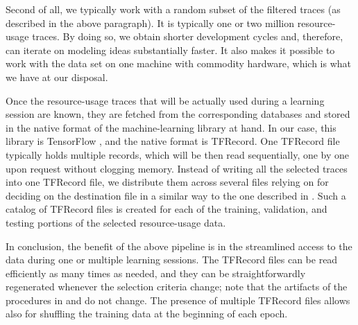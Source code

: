 Second of all, we typically work with a random subset of the filtered traces (as
described in the above paragraph). It is typically one or two million
resource-usage traces. By doing so, we obtain shorter development cycles and,
therefore, can iterate on modeling ideas substantially faster. It also makes it
possible to work with the data set on one machine with commodity hardware, which
is what we have at our disposal.

Once the resource-usage traces that will be actually used during a learning
session are known, they are fetched from the corresponding databases and stored
in the native format of the machine-learning library at hand. In our case, this
library is TensorFlow \cite{abadi2015}, and the native format is TFRecord. One
TFRecord file typically holds multiple records, which will be then read
sequentially, one by one upon request without clogging memory. Instead of
writing all the selected traces into one TFRecord file, we distribute them
across several files relying on  for deciding on the destination file in
a similar way to the one described in . Such a catalog of
TFRecord files is created for each of the training, validation, and testing
portions of the selected resource-usage data.

In conclusion, the benefit of the above pipeline is in the streamlined access to
the data during one or multiple learning sessions. The TFRecord files can be
read efficiently as many times as needed, and they can be straightforwardly
regenerated whenever the selection criteria change; note that the artifacts of
the procedures in  and  do not change. The
presence of multiple TFRecord files allows also for shuffling the training data
at the beginning of each epoch.

